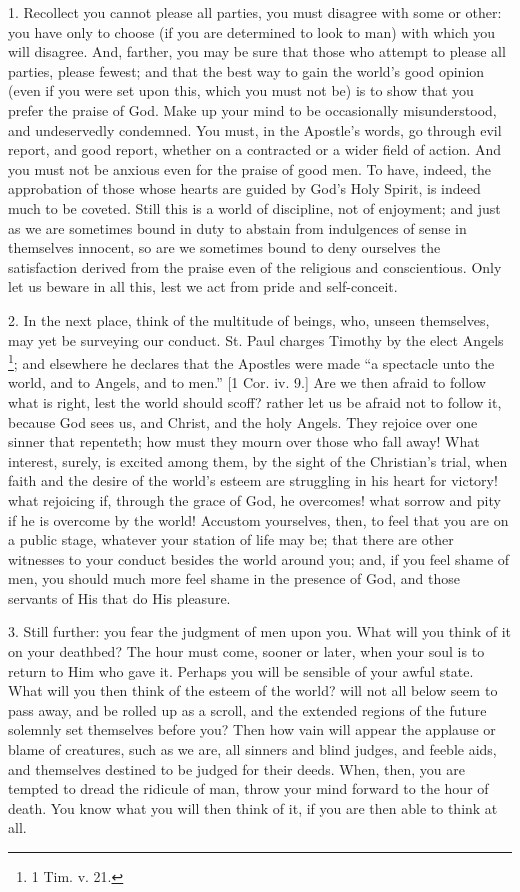 1. Recollect you cannot please all parties, you must disagree with
some or other: you have only to choose (if you are determined to look
to man) with which you will disagree. And, farther, you may be sure
that those who attempt to please all parties, please fewest; and that
the best way to gain the world's good opinion (even if you were set
upon this, which you must not be) is to show that you prefer the
praise of God. Make up your mind to be occasionally misunderstood, and
undeservedly condemned. You must, in the Apostle's words, go through
evil report, and good report, whether on a contracted or a wider field
of action. And you must not be anxious even for the praise of good
men. To have, indeed, the approbation of those whose hearts are guided
by God's Holy Spirit, is indeed much to be coveted. Still this is a
world of discipline, not of enjoyment; and just as we are sometimes
bound in duty to abstain from indulgences of sense in themselves
innocent, so are we sometimes bound to deny ourselves the satisfaction
derived from the praise even of the religious and conscientious. Only
let us beware in all this, lest we act from pride and self-conceit.

2. In the next place, think of the multitude of beings, who, unseen
themselves, may yet be surveying our conduct. St. Paul charges Timothy
by the elect Angels \footnote{1 Tim. v. 21.}; and elsewhere he declares that
the Apostles were made ``a spectacle unto the world, and to
Angels, and to men.'' [1 Cor. iv. 9.] Are we then afraid to follow
what is right, lest the world should scoff? rather let us be afraid
not to follow it, because God sees us, and Christ, and the holy
Angels. They rejoice over one sinner that repenteth; how must they
mourn over those who fall away! What interest, surely, is excited
among them, by the sight of the Christian's trial, when faith and the
desire of the world's esteem are struggling in his heart for victory!
what rejoicing if, through the grace of God, he overcomes! what sorrow
and pity if he is overcome by the world! Accustom yourselves, then, to
feel that you are on a public stage, whatever your station of life may
be; that there are other witnesses to your conduct besides the world
around you; and, if you feel shame of men, you should much more feel
shame in the presence of God, and those servants of His that do His
pleasure.

3. Still further: you fear the judgment of men upon you. What will
you think of it on your deathbed? The hour must come, sooner or later,
when your soul is to return to Him who gave it. Perhaps you will be
sensible of your awful state. What will you then think of the esteem
of the world? will not all below seem to pass away, and be rolled up
as a scroll, and the extended regions of the future solemnly set
themselves before you? Then how vain will appear the applause or blame
of creatures, such as we are, all sinners and blind judges, and feeble
aids, and themselves destined to be judged for their deeds. When,
then, you are tempted to dread the ridicule of man, throw your mind
forward to the hour of death. You know what you will then think of it,
if you are then able to think at all.

